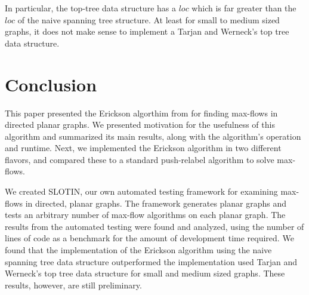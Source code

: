 \documentclass[12pt]{article}
\begin{document}
In particular, the top-tree data structure has a $loc$ which is far greater than the $loc$ of the naive spanning tree structure. At least for small to medium sized graphs, it does not make sense to implement a Tarjan and Werneck's top tree data structure.

\section{Conclusion}

This paper presented the Erickson algorthim from \cite{erickson2010} for finding max-flows in directed planar graphs. We presented motivation for the usefulness of this algorithm and summarized its main results, along with the algorithm's operation and runtime. Next, we implemented the Erickson algorithm in two different flavors, and compared these to a standard push-relabel algorithm to solve max-flows. 

We created SLOTIN, our own automated testing framework for examining max-flows in directed, planar graphs. The framework generates planar graphs and tests an arbitrary number of max-flow algorithms on each planar graph. The results from the automated testing were found and analyzed, using the number of lines of code as a benchmark for the amount of development time required. We found that the implementation of the Erickson algorithm using the naive spanning tree data structure outperformed the implementation used Tarjan and Werneck's top tree data structure for small and medium sized graphs. These results, however, are still preliminary.

\newpage
\end{document}
